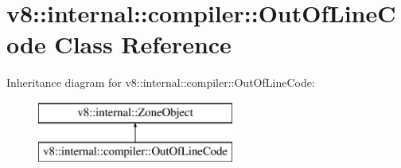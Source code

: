 \hypertarget{classv8_1_1internal_1_1compiler_1_1_out_of_line_code}{}\section{v8\+:\+:internal\+:\+:compiler\+:\+:Out\+Of\+Line\+Code Class Reference}
\label{classv8_1_1internal_1_1compiler_1_1_out_of_line_code}
Inheritance diagram for v8\+:\+:internal\+:\+:compiler\+:\+:Out\+Of\+Line\+Code\+:\begin{figure}[H]
\begin{center}
\leavevmode
\includegraphics[height=2.000000cm]{classv8_1_1internal_1_1compiler_1_1_out_of_line_code}
\end{center}
\end{figure}
